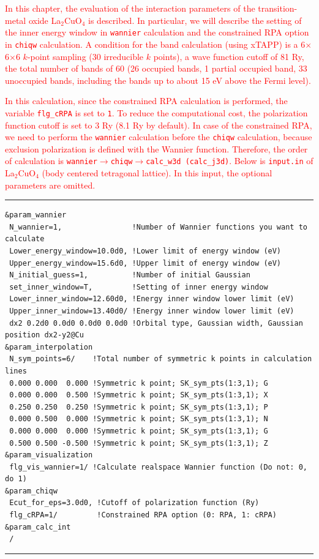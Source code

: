 \documentclass{article}
\newcommand{\tr}[1]{\textcolor{red}{#1}}
\begin{document}
\tr{In this chapter, the evaluation of the interaction parameters of the transition-metal oxide La$_2$CuO$_4$ is described. In particular, we will describe the setting of the inner energy window in {\tt wannier} calculation and the constrained RPA option in {\tt chiqw} calculation. A condition for the band calculation (using {\sc xTAPP}) is a  6$\times$6$\times$6 $k$-point sampling (30 irreducible $k$ points), a wave function cutoff of 81 Ry, the total number of bands of 60 (26 occupied bands, 1 partial occupied band, 33 unoccupied bands, including the bands up to about 15 eV above the Fermi level).} 

\tr{In this calculation, since the constrained RPA calculation is performed, the variable {\tt flg\_cRPA} is set to {\tt 1}. To reduce the computational cost, the polarization function cutoff is set to 3 Ry (8.1 Ry by default). In case of the constrained RPA, we need to perform the {\tt wannier} calculation before the {\tt chiqw} calculation, because exclusion polarization is defined with the Wannier function. Therefore, the order of calculation is {\tt wannier}$\to${\tt chiqw}$\to${\tt calc\_w3d (calc\_j3d)}. Below is {\tt input.in} of La$_2$CuO$_4$ (body centered tetragonal lattice). In this input, the optional parameters are omitted.} 
\vspace{3mm}\hrule
\begin{verbatim}
&param_wannier 
 N_wannier=1,                !Number of Wannier functions you want to calculate
 Lower_energy_window=10.0d0, !Lower limit of energy window (eV)
 Upper_energy_window=15.6d0, !Upper limit of energy window (eV)
 N_initial_guess=1,          !Number of initial Gaussian
 set_inner_window=T,         !Setting of inner energy window
 Lower_inner_window=12.60d0, !Energy inner window lower limit (eV)
 Upper_inner_window=13.40d0/ !Energy inner window lower limit (eV)
 dx2 0.2d0 0.0d0 0.0d0 0.0d0 !Orbital type, Gaussian width, Gaussian position dx2-y2@Cu
&param_interpolation   
 N_sym_points=6/    !Total number of symmetric k points in calculation lines
 0.000 0.000  0.000 !Symmetric k point; SK_sym_pts(1:3,1); G
 0.000 0.000  0.500 !Symmetric k point; SK_sym_pts(1:3,1); X
 0.250 0.250  0.250 !Symmetric k point; SK_sym_pts(1:3,1); P
 0.000 0.500  0.000 !Symmetric k point; SK_sym_pts(1:3,1); N
 0.000 0.000  0.000 !Symmetric k point; SK_sym_pts(1:3,1); G
 0.500 0.500 -0.500 !Symmetric k point; SK_sym_pts(1:3,1); Z
&param_visualization
 flg_vis_wannier=1/ !Calculate realspace Wannier function (Do not: 0, do 1)   
&param_chiqw 
 Ecut_for_eps=3.0d0, !Cutoff of polarization function (Ry)
 flg_cRPA=1/         !Constrained RPA option (0: RPA, 1: cRPA)
&param_calc_int 
 /
\end{verbatim}
\hrule\vspace{3mm}
\end{document}
